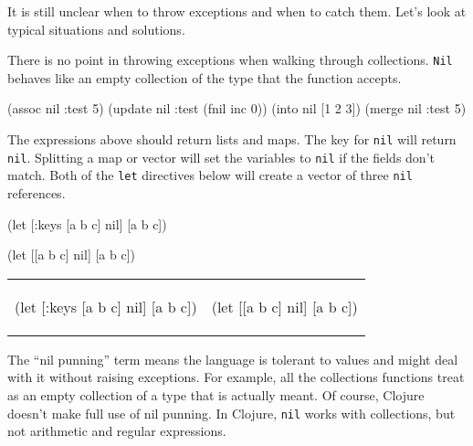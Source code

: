 It is still unclear when to throw exceptions and when to catch them. Let's look at typical situations and solutions.

There is no point in throwing exceptions when walking through collections. \verb|Nil| behaves like an empty collection of the type that the function accepts.

\begin{clojure}
(assoc nil :test 5)
(update nil :test (fnil inc 0))
(into nil [1 2 3])
(merge nil {:test 5})
\end{clojure}

\noindent
The expressions above should return lists and maps. The key for \verb|nil| will return \verb|nil|. Splitting a map or vector will set the variables to \verb|nil| if the fields don't match. Both of the \verb|let| directives below will create a vector of three \verb|nil| references.

\ifnarrow

\begin{clojure}
(let [{:keys [a b c]} nil]
  [a b c])
\end{clojure}

\splitter

\begin{clojure}
(let [[a b c] nil]
  [a b c])
\end{clojure}

\else

\noindent
\begin{tabular}{ @{}p{5cm} @{}p{5cm} }

\begin{clojure}
(let [{:keys [a b c]} nil]
  [a b c])
\end{clojure}

&

\begin{clojure}
(let [[a b c] nil]
  [a b c])
\end{clojure}

\end{tabular}

\fi


The ``nil punning'' term means the language is tolerant to  values and might deal with it without raising exceptions. For example, all the collections functions treat  as an empty collection of a type that is actually meant. Of course, Clojure doesn't make full use of nil punning. In Clojure, \verb|nil| works with collections, but not arithmetic and regular expressions.

